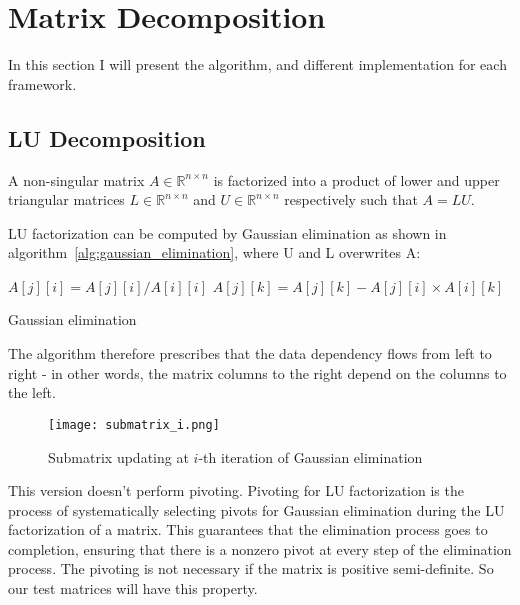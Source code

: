 \chapter{Matrix Decomposition}
\label{matrix_decomposition}
In this section I will present the algorithm, and different implementation for each framework.
\section{LU Decomposition}
A non-singular matrix $A \in \mathbb{R}^{n \times n}$ is factorized into a product of lower and upper triangular matrices $L \in \mathbb{R}^{n \times n}$ and $U \in \mathbb{R}^{n \times n}$ respectively such that $A = LU$.

LU factorization can be computed by Gaussian elimination as
shown in algorithm~\ref{alg:gaussian_elimination}, where U and L overwrites A:

\begin{algorithm}
\begin{algorithmic}
		\State $A[j][i] = A[j][i] / A[i][i]$ 
	\EndFor
			\State $A[j][k] = A[j][k] - A[j][i] \times A[i][k]$ 
		\EndFor	
	\EndFor
\EndFor
\end{algorithmic}
\caption{Gaussian elimination}
\label{alg:gaussian_elimination}
\end{algorithm}

The algorithm therefore prescribes that the data dependency flows from left to right - in other words, the matrix columns to the right depend on the columns to the left. 

\begin{figure}[H]
\centering
\texttt{[image: submatrix\_i.png]}
\caption{Submatrix updating at $i$-th iteration of Gaussian elimination}
\end{figure}


This version doesn't perform pivoting. Pivoting for LU factorization is the process of systematically selecting pivots for Gaussian elimination
during the LU factorization of a matrix. This guarantees that the elimination process goes to completion, ensuring that there is a nonzero pivot at every step of the elimination process. The pivoting is not necessary if the matrix is positive semi-definite. So our test matrices will have this property.


